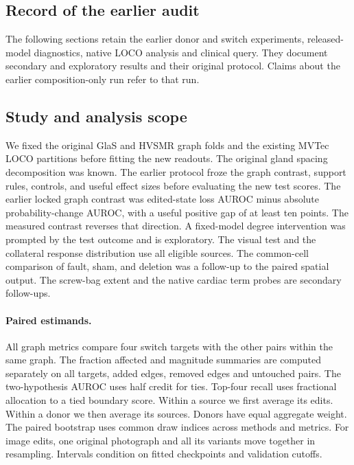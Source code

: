 \subsection{Record of the earlier audit}
The following sections retain the earlier donor and switch experiments, released-model diagnostics, native LOCO analysis and clinical query. They document secondary and exploratory results and their original protocol. Claims about the earlier composition-only run refer to that run.

\subsection{Study and analysis scope}
We fixed the original GlaS and HVSMR graph folds and the existing MVTec LOCO partitions before fitting the new readouts. The original gland spacing decomposition was known. The earlier protocol froze the graph contrast, support rules, controls, and useful effect sizes before evaluating the new test scores. The earlier locked graph contrast was edited-state loss AUROC minus absolute probability-change AUROC, with a useful positive gap of at least ten points. The measured contrast reverses that direction. A fixed-model degree intervention was prompted by the test outcome and is exploratory. The visual test and the collateral response distribution use all eligible sources. The common-cell comparison of fault, sham, and deletion was a follow-up to the paired spatial output. The screw-bag extent and the native cardiac term probes are secondary follow-ups.

\paragraph{Paired estimands.}
All graph metrics compare four switch targets with the other pairs within the same graph. The fraction affected and magnitude summaries are computed separately on all targets, added edges, removed edges and untouched pairs. The two-hypothesis AUROC uses half credit for ties. Top-four recall uses fractional allocation to a tied boundary score. Within a source we first average its edits. Within a donor we then average its sources. Donors have equal aggregate weight. The paired bootstrap uses common draw indices across methods and metrics. For image edits, one original photograph and all its variants move together in resampling. Intervals condition on fitted checkpoints and validation cutoffs.

